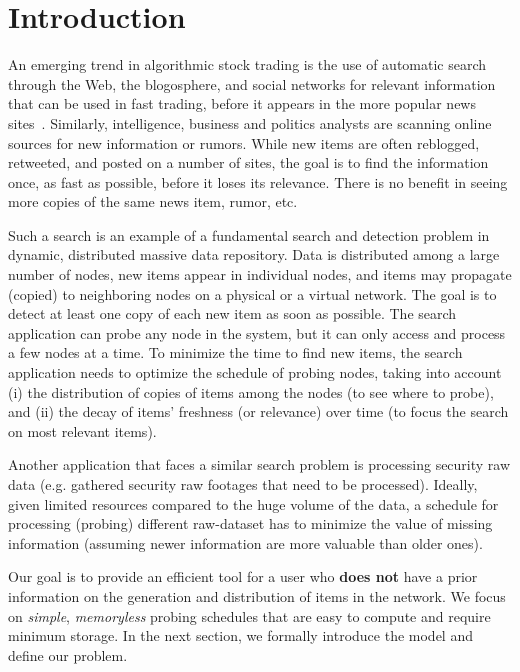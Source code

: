 \section{Introduction}\label{sec:introduction}
An emerging trend in algorithmic stock trading is the use of automatic search through the Web, the blogosphere, and social networks for relevant information that can be used in fast trading, before it appears in the more popular news sites~\cite{Delaney2009,ALPHA2014,AlphaFlash,mitra2011handbook,latar2015robot,wallstreet2015,McKinney2011}. Similarly, intelligence, business and politics analysts are scanning online sources for new information or rumors. While new items are often reblogged, retweeted, and posted on a number of sites, the goal is to find the information once, as fast as possible, before it loses its relevance. There is no benefit in seeing more copies of the same news item, rumor, etc.

Such a search is an example of a fundamental search and detection problem in dynamic, distributed massive data repository.  Data is distributed among a large number of nodes, new items appear in individual nodes, and items may propagate (copied) to neighboring nodes on a physical or a virtual network.  The goal is to detect at least one copy of each new item as soon as possible. The search application can probe any node in the system, but it can only access and process a few nodes at a time. 
To minimize the time to find new items, the search application needs to optimize the schedule of probing nodes, taking into account (i) the  distribution of copies of items among the nodes (to see where to probe), and (ii) the decay of items' freshness (or relevance) over time (to focus the search on most relevant items).


Another application that faces a similar search problem is processing security raw data (e.g. gathered security raw footages that need to be processed). Ideally, given limited resources compared to the huge volume of the data, a schedule for processing (probing) different raw-dataset has to minimize the value of missing information (assuming newer information are more valuable than older ones).

Our goal is to provide an efficient tool for a user who {\bf does not} have a prior information on the generation and distribution of items in the network. We focus on \emph{simple}, \emph{memoryless} probing schedules that are easy to compute and require minimum storage. In the next section, we formally introduce the model and define our problem.

